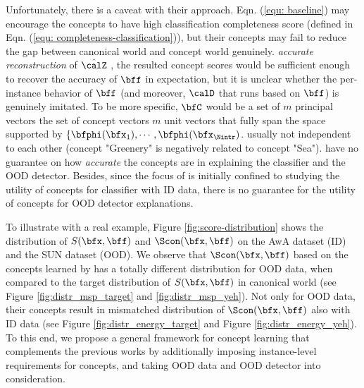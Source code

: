 Unfortunately, there is a caveat with their approach.
Eqn. (\ref{equ: baseline}) may encourage the concepts to have high classification completeness score (defined in Eqn. (\ref{equ: completeness-classification})), but their concepts may fail to reduce the gap between canonical world and concept world genuinely. 
\textit{accurate reconstruction} of $\hat{\calZ}$
, the resulted concept scores would be sufficient enough to recover the accuracy of $\bff$ in expectation, but it is unclear whether the per-instance behavior of $\bff$ (and moreover, $\calD$ that runs based on $\bff$) is genuinely imitated.
To be more specific, $\bfC$ would be a set of $m$ principal vectors 
the set of concept vectors
$m$ unit vectors that fully span the space supported by $\{\bfphi(\bfx_1), \cdots, \bfphi(\bfx_{\Nintr})$.
usually not independent to each other (\eg concept "Greenery" is negatively related to concept "Sea").
have no guarantee on how \textit{accurate} the concepts are in explaining the classifier and the OOD detector.
Besides, since the focus of \cite{yeh2019completeness} is initially confined to studying the utility of concepts for classifier with ID data, there is no guarantee for the utility of concepts for OOD detector explanations.

To illustrate with a real example, Figure \ref{fig:score-distribution} shows the distribution of $S(\bfx, \bff)$ and $\Scon(\bfx, \bff)$ on the AwA dataset (ID) and the SUN dataset (OOD).
We observe that $\Scon(\bfx, \bff)$ based on the concepts learned by \cite{yeh2019completeness} has a totally different distribution for OOD data, when compared to the target distribution of $S(\bfx, \bff)$ in canonical world (see Figure \ref{fig:distr_msp_target} and \ref{fig:distr_msp_yeh}).
Not only for OOD data, their concepts result in mismatched distribution of $\Scon(\bfx, \bff)$ also with ID data (see Figure \ref{fig:distr_energy_target} and Figure \ref{fig:distr_energy_yeh}). 
To this end, we propose a general framework for concept learning that complements the previous works by additionally imposing instance-level requirements for concepts, and taking OOD data and OOD detector into consideration.

